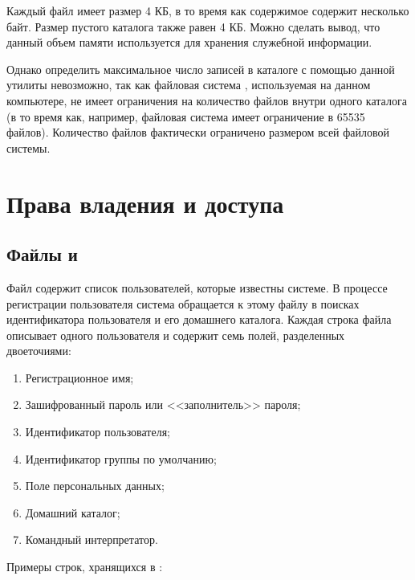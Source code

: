 Каждый файл имеет размер 4 КБ, в то время как содержимое содержит несколько байт. Размер пустого каталога также равен 4 КБ. Можно сделать вывод, что данный объем памяти используется для хранения служебной информации.

Однако определить максимальное число записей в каталоге с помощью данной утилиты невозможно, так как файловая система , используемая на данном компьютере, не имеет ограничения на количество файлов внутри одного каталога (в то время как, например, файловая система  имеет ограничение в 65535 файлов). Количество файлов фактически ограничено размером всей файловой системы.

\section{Права владения и доступа}

\subsection{Файлы  и }

Файл  содержит список пользователей, которые известны системе. В процессе регистрации пользователя система обращается к этому файлу в поисках идентификатора пользователя и его домашнего каталога. Каждая строка файла описывает одного пользователя и  содержит семь полей, разделенных двоеточиями:
\begin{enumerate}
	\item Регистрационное имя;
	\item Зашифрованный пароль или <<заполнитель>> пароля;
	\item Идентификатор пользователя;
	\item Идентификатор группы по умолчанию;
	\item Поле персональных данных;
	\item Домашний каталог;
	\item Командный интерпретатор.
\end{enumerate}

Примеры строк, хранящихся в :


